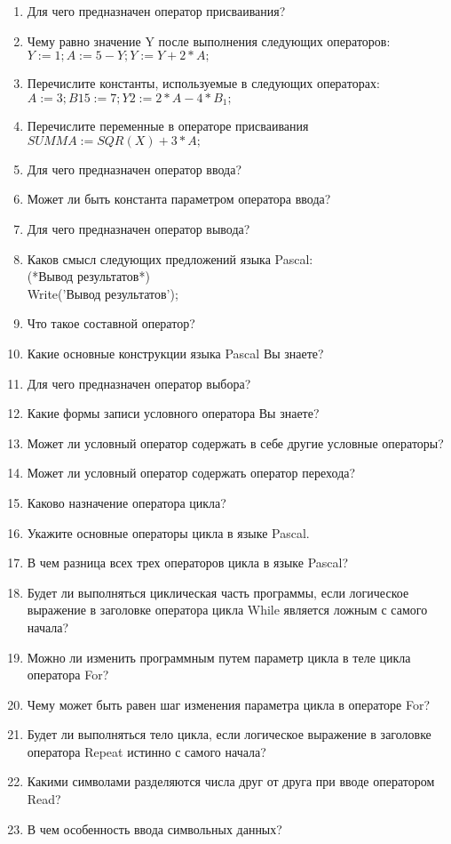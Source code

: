 \begin{enumerate}
\item Для чего предназначен оператор присваивания?
\item Чему равно значение Y после выполнения следующих операторов: $Y:=1; A:=5 - Y; Y:=Y + 2*A;$
\item Перечислите константы, используемые в следующих опера­торах: $A:=3; B15:=7; Y2:=2*A - 4*B_1;$
\item Перечислите переменные в операторе присваивания
$SUMMA:= SQR(X) + 3*A;$
\item Для чего предназначен оператор ввода?
\item Может ли быть константа параметром оператора ввода?
\item Для чего предназначен оператор вывода?
\item Каков смысл следующих предложений языка Pascal:\\
(*Вывод результатов*) \\Write('Вывод результатов');
\item Что такое составной оператор?
\item Какие основные конструкции языка Pascal Вы знаете?
\item Для чего предназначен оператор выбора?
\item Какие формы записи условного оператора Вы знаете?
\item Может ли условный оператор содержать в себе другие условные операторы?
\item Может ли условный оператор содержать оператор пере­хода?
\item Каково назначение оператора цикла?
\item Укажите основные операторы цикла в языке Pascal.
\item В чем разница всех трех операторов цикла в языке Pascal?
\item Будет ли выполняться циклическая часть программы, если логическое выражение в заголовке оператора цикла While является ложным с самого начала?
\item Можно ли изменить программным путем параметр цикла в теле цикла оператора For?
\item Чему может быть равен шаг изменения параметра цикла в операторе For?
\item Будет ли выполняться тело цикла, если логическое выра­жение в заголовке оператора Repeat истинно с самого начала?
\item Какими символами разделяются числа друг от друга при вводе оператором Read?
\item В чем особенность ввода символьных данных?

\end{enumerate}
